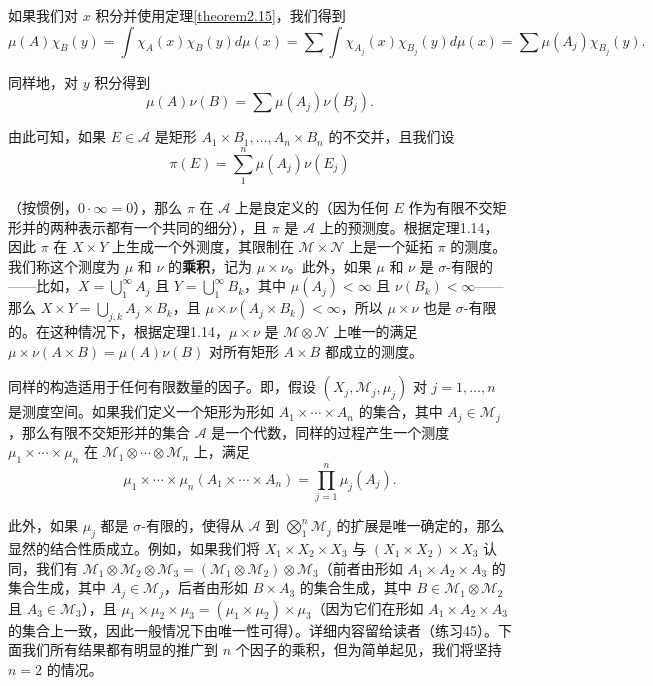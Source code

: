 \documentclass[lang=cn,10pt,thmcnt=section]{elegantbook}
\begin{document}
如果我们对 $x$ 积分并使用定理\ref{theorem2.15}，我们得到
\[ \mu(A)\chi_B(y) = \int \chi_A(x)\chi_B(y) d\mu(x) = \sum \int \chi_{A_j}(x)\chi_{B_j}(y) d\mu(x) = \sum \mu(A_j)\chi_{B_j}(y). \]

同样地，对 $y$ 积分得到
\[ \mu(A)\nu(B) = \sum \mu(A_j)\nu(B_j). \]

由此可知，如果 $E \in \mathcal{A}$ 是矩形 $A_1 \times B_1, \ldots, A_n \times B_n$ 的不交并，且我们设
\[ \pi(E) = \sum_{1}^{n} \mu(A_j)\nu(E_j) \]

（按惯例，$0 \cdot \infty = 0$），那么 $\pi$ 在 $\mathcal{A}$ 上是良定义的（因为任何 $E$ 作为有限不交矩形并的两种表示都有一个共同的细分），且 $\pi$ 是 $\mathcal{A}$ 上的预测度。根据定理1.14，因此 $\pi$ 在 $X \times Y$ 上生成一个外测度，其限制在 $\mathcal{M} \times \mathcal{N}$ 上是一个延拓 $\pi$ 的测度。我们称这个测度为 $\mu$ 和 $\nu$ 的\textbf{乘积}，记为 $\mu \times \nu$。此外，如果 $\mu$ 和 $\nu$ 是 $\sigma$-有限的——比如，$X = \bigcup_1^\infty A_j$ 且 $Y = \bigcup_1^\infty B_k$，其中 $\mu(A_j) < \infty$ 且 $\nu(B_k) < \infty$——那么 $X \times Y = \bigcup_{j,k} A_j \times B_k$，且 $\mu \times \nu(A_j \times B_k) < \infty$，所以 $\mu \times \nu$ 也是 $\sigma$-有限的。在这种情况下，根据定理1.14，$\mu \times \nu$ 是 $\mathcal{M} \otimes \mathcal{N}$ 上唯一的满足 $\mu \times \nu(A \times B) = \mu(A)\nu(B)$ 对所有矩形 $A \times B$ 都成立的测度。

同样的构造适用于任何有限数量的因子。即，假设 $(X_j, \mathcal{M}_j, \mu_j)$ 对 $j = 1, \ldots, n$ 是测度空间。如果我们定义一个矩形为形如 $A_1 \times \cdots \times A_n$ 的集合，其中 $A_j \in \mathcal{M}_j$，那么有限不交矩形并的集合 $\mathcal{A}$ 是一个代数，同样的过程产生一个测度 $\mu_1 \times \cdots \times \mu_n$ 在 $\mathcal{M}_1 \otimes \cdots \otimes \mathcal{M}_n$ 上，满足
\[ \mu_1 \times \cdots \times \mu_n(A_1 \times \cdots \times A_n) = \prod_{j=1}^{n} \mu_j(A_j). \]

此外，如果 $\mu_j$ 都是 $\sigma$-有限的，使得从 $\mathcal{A}$ 到 $\bigotimes_1^n \mathcal{M}_j$ 的扩展是唯一确定的，那么显然的结合性质成立。例如，如果我们将 $X_1 \times X_2 \times X_3$ 与 $(X_1 \times X_2) \times X_3$ 认同，我们有 $\mathcal{M}_1 \otimes \mathcal{M}_2 \otimes \mathcal{M}_3 = (\mathcal{M}_1 \otimes \mathcal{M}_2) \otimes \mathcal{M}_3$（前者由形如 $A_1 \times A_2 \times A_3$ 的集合生成，其中 $A_j \in \mathcal{M}_j$，后者由形如 $B \times A_3$ 的集合生成，其中 $B \in \mathcal{M}_1 \otimes \mathcal{M}_2$ 且 $A_3 \in \mathcal{M}_3$），且 $\mu_1 \times \mu_2 \times \mu_3 = (\mu_1 \times \mu_2) \times \mu_3$（因为它们在形如 $A_1 \times A_2 \times A_3$ 的集合上一致，因此一般情况下由唯一性可得）。详细内容留给读者（练习45）。下面我们所有结果都有明显的推广到 $n$ 个因子的乘积，但为简单起见，我们将坚持 $n = 2$ 的情况。
\end{document}
